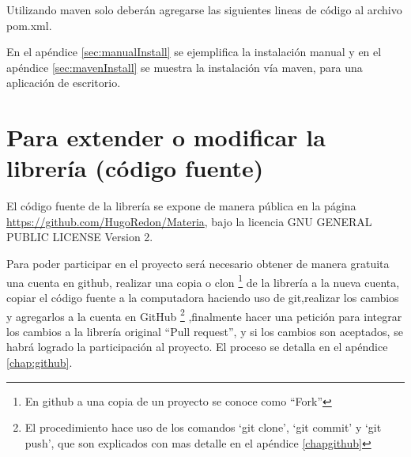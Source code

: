     Utilizando maven solo deberán agregarse las siguientes lineas de código al archivo pom.xml.

    

    En el apéndice \ref{sec:manualInstall} se ejemplifica la instalación manual y en el apéndice \ref{sec:mavenInstall} se muestra la instalación vía maven, para una aplicación de escritorio.


  \section{Para extender o modificar la librería (código fuente)}

    El código fuente de la librería se expone de manera pública en la página \url{https://github.com/HugoRedon/Materia}, bajo la licencia GNU GENERAL PUBLIC LICENSE Version 2.
  
    Para poder participar en el proyecto será necesario obtener de manera gratuita una cuenta en github, realizar una copia o clon \footnote{En github a una copia de un proyecto se conoce como ``Fork''} de la librería  a la nueva cuenta, copiar el código fuente a la computadora haciendo uso de git,realizar los cambios y agregarlos a la cuenta en GitHub  \footnote{El procedimiento hace uso de los comandos `git clone', `git commit' y `git push', que son explicados con mas detalle en el apéndice \ref{chapgithub}} ,finalmente hacer una petición para integrar los cambios a la librería original ``Pull request'', y si los cambios son aceptados, se habrá logrado la participación al proyecto. El proceso se detalla en el apéndice \ref{chap:github}.



